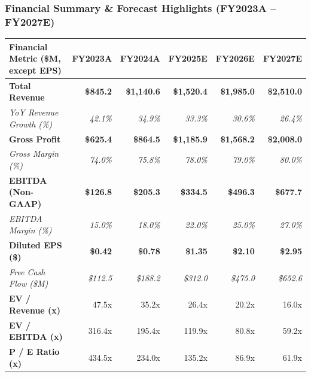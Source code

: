 \documentclass[10pt,a4paper]{scrartcl}
\begin{document}
\vspace{8pt}

\textcolor{NavyPrimary}{\subsubsection*{Financial Summary \& Forecast Highlights (FY2023A -- FY2027E)}}
\vspace{-4pt}

{\small
\setlength{\tabcolsep}{4pt}
\begin{tabularx}{\textwidth}{@{} L r r r r r @{}}
\toprule
{}
\textbf{Financial Metric (\$M, except EPS)} & \textbf{FY2023A} & \textbf{FY2024A} & \textbf{FY2025E} & \textbf{FY2026E} & \textbf{FY2027E} \\
\midrule
\textbf{Total Revenue} & \textbf{\$845.2} & \textbf{\$1,140.6} & \textbf{\$1,520.4} & \textbf{\$1,985.0} & \textbf{\$2,510.0} \\
\textit{YoY Revenue Growth (\%)} & \textit{42.1\%} & \textit{34.9\%} & \textit{33.3\%} & \textit{30.6\%} & \textit{26.4\%} \\
\textbf{Gross Profit} & \textbf{\$625.4} & \textbf{\$864.5} & \textbf{\$1,185.9} & \textbf{\$1,568.2} & \textbf{\$2,008.0} \\
\textit{Gross Margin (\%)} & \textit{74.0\%} & \textit{75.8\%} & \textit{78.0\%} & \textit{79.0\%} & \textit{80.0\%} \\
\textbf{EBITDA (Non-GAAP)} & \textbf{\$126.8} & \textbf{\$205.3} & \textbf{\$334.5} & \textbf{\$496.3} & \textbf{\$677.7} \\
\textit{EBITDA Margin (\%)} & \textit{15.0\%} & \textit{18.0\%} & \textit{22.0\%} & \textit{25.0\%} & \textit{27.0\%} \\
\textbf{Diluted EPS (\$)} & \textbf{\$0.42} & \textbf{\$0.78} & \textbf{\$1.35} & \textbf{\$2.10} & \textbf{\$2.95} \\
\textit{Free Cash Flow (\$M)} & \textit{\$112.5} & \textit{\$188.2} & \textit{\$312.0} & \textit{\$475.0} & \textit{\$652.6} \\
\midrule
\textbf{EV / Revenue (x)} & 47.5x & 35.2x & 26.4x & 20.2x & 16.0x \\
\textbf{EV / EBITDA (x)} & 316.4x & 195.4x & 119.9x & 80.8x & 59.2x \\
\textbf{P / E Ratio (x)} & 434.5x & 234.0x & 135.2x & 86.9x & 61.9x \\
\bottomrule
\end{tabularx}
}
\end{document}
